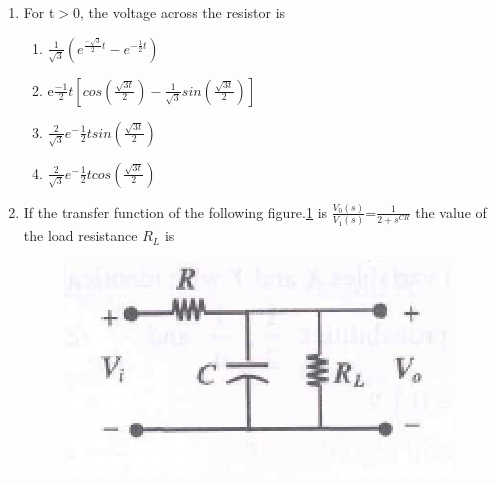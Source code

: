 \documentclass[journal,12pt,twocolumn]{IEEEtran}
\begin{document}
\begin{enumerate}
\item For t$>$0, the voltage across the resistor is
\begin{enumerate}
\setlength\itemsep{2em}
\item $\frac{1}{\sqrt{3}}(e^{\frac{-\sqrt{3}}{2}t}-e^{-\frac{1}{2}t})$
\item e$\frac{-1}{2}t[cos (\frac{\sqrt{3t}}{2})-\frac{1}{\sqrt{3}}sin(\frac{\sqrt{3t}}{2})]$
\item $ \frac{2}{\sqrt{3}}e^-{\frac{1}{2}t}sin(\frac{\sqrt{3t}}{2}) $
\item $ \frac{2}{\sqrt{3}}e^-{\frac{1}{2}t}cos(\frac{\sqrt{3t}}{2}) $
\end{enumerate}


\item If the transfer function of the following figure.\ref{fig73} is $\frac{V_{0}(s)}{V_{1}(s)}$=$\frac{1}{2+s^{CR}}$ the value of the load resistance $R_{L}$ is
\begin{enumerate}
\setlength\itemsep{2em}
\begin{figure}[!h]
\begin{center}
\includegraphics[scale=0.9]{./figs/fig73.eps}
\caption{}
\label{fig73}
\end{center}
\end{figure}
\end{enumerate}
 

\end{enumerate}
\end{document}
